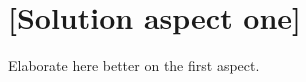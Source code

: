 \chapter{[Solution aspect one]}
\label{capitolo5}
\thispagestyle{empty}

Elaborate here better on the first aspect.